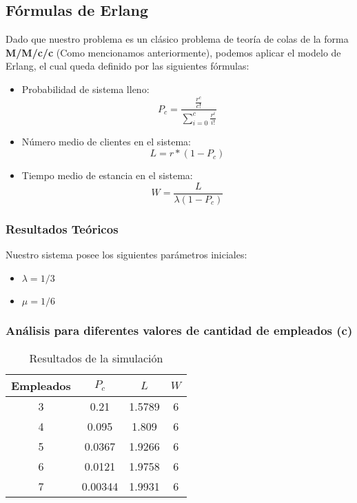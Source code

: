 \documentclass{article}
\begin{document}
\subsection{Fórmulas de Erlang}

Dado que nuestro problema es un clásico problema de teoría de colas de la forma \textbf{M/M/c/c} (Como mencionamos anteriormente), podemos aplicar el modelo de Erlang, el cual queda definido por las siguientes fórmulas:

\begin{itemize}
    \item Probabilidad de sistema lleno: 
    \[
    P_c = \frac{\frac{r^c}{c!}}{\sum_{i=0}^{c} \frac{r^i}{i!}}
    \]
    \item Número medio de clientes en el sistema: 
    \[
    L = r*(1- P_c)
    \]
    \item Tiempo medio de estancia en el sistema: 
    \[
    W = \frac{L}{\lambda (1 - P_c)}
    \]
\end{itemize}

\subsubsection*{Resultados Teóricos}

Nuestro sistema posee los siguientes parámetros iniciales:
\begin{itemize}
    \item $\lambda = 1/3$
    \item $\mu = 1/6$
\end{itemize}

\subsubsection*{Análisis para diferentes valores de cantidad de empleados (c)}

\begin{table}[H]
    \centering
    \caption{Resultados de la simulación}
    \begin{tabular}{cccc}
        \toprule
        Empleados & $P_c$ & $L$ & $W$ \\
        \midrule
        3 & 0.21 & 1.5789 & 6 \\
        4 & 0.095 & 1.809 & 6 \\
        5 & 0.0367 & 1.9266 & 6 \\
        6 & 0.0121 & 1.9758 & 6 \\
        7 & 0.00344 & 1.9931 & 6 \\
        \bottomrule
    \end{tabular}
\end{table}
\end{document}

